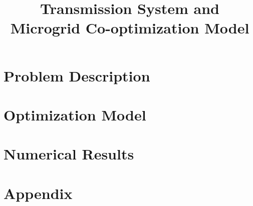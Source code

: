 \documentclass[review]{elsarticle}
\begin{document}
\begin{frontmatter}
\title{Transmission System and Microgrid Co-optimization Model}
%
%
%
\end{frontmatter}


\printnomenclature
%

\section{Problem Description}\label{sec:pd}


\section{Optimization Model}\label{sec:Model}


\section{Numerical Results}\label{sec:Results}

%

\section{Appendix}\label{sec:Appendix}

%




\end{document}
